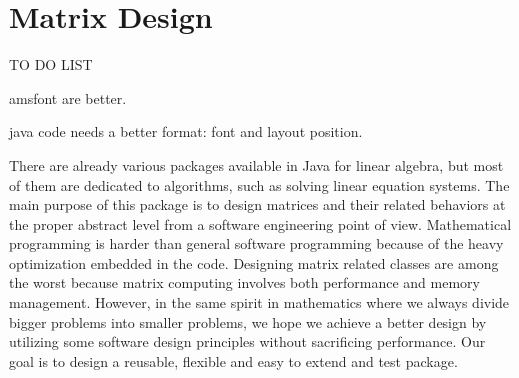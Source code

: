 \chapter{Matrix Design}
\minitoc

TO DO LIST

amsfont are better.

java code needs a better format: font and layout position.


There are already various packages available in Java for linear algebra, but most of them are dedicated to algorithms, such as solving linear equation systems. The main purpose of this package is to design matrices and their related behaviors at the proper abstract level from a software engineering point of view. Mathematical programming is harder than general software programming because of the heavy optimization embedded in the code. Designing matrix related classes are among the worst because matrix computing involves both performance and memory management. However, in the same spirit in mathematics where we always divide bigger problems into smaller problems, we hope we achieve a better design by utilizing some software design principles without sacrificing performance. Our goal is to design a reusable, flexible and easy to extend and test package.

